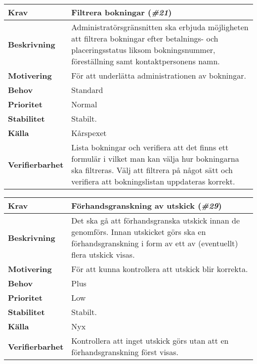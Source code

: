 \documentclass[a4paper, twoside, 11pt, titlepage]{article}
\begin{document}
		\begin{tabular} { p{2.6cm} p{12.5cm} }
			\hline
			\sffamily\textbf{Krav} & Filtrera bokningar (\emph{\#21})  \\
			\hline
			\sffamily\textbf{Beskrivning} & Administratörsgränsnitten ska erbjuda möjligheten att filtrera bokningar efter betalnings- och placeringsstatus liksom bokningsnummer, föreställning samt kontaktpersonens namn.  \\
			\hline
			\sffamily\textbf{Motivering} & För att underlätta administrationen av bokningar.  \\
			\hline
			\sffamily\textbf{Behov} & Standard  \\
			\hline
			\sffamily\textbf{Prioritet} & Normal  \\
			\hline
			\sffamily\textbf{Stabilitet} & Stabilt.  \\
			\hline
			\sffamily\textbf{Källa} & Kårspexet  \\
			\hline
			\sffamily\textbf{Verifierbarhet} & Lista bokningar och verifiera att det finns ett formulär i vilket man kan välja hur bokningarna ska filtreras. Välj att filtrera på något sätt och verifiera att bokningslistan uppdateras korrekt.  \\
			\hline
		\end{tabular}
		\vspace{6mm}

		\begin{tabular} { p{2.6cm} p{12.5cm} }
			\hline
			\sffamily\textbf{Krav} & Förhandsgranskning av utskick (\emph{\#29})  \\
			\hline
			\sffamily\textbf{Beskrivning} & Det ska gå att förhandsgranska utskick innan de genomförs. Innan utskicket görs ska en förhandsgranskning i form av ett av (eventuellt) flera utskick visas.  \\
			\hline
			\sffamily\textbf{Motivering} & För att kunna kontrollera att utskick blir korrekta.  \\
			\hline
			\sffamily\textbf{Behov} & Plus  \\
			\hline
			\sffamily\textbf{Prioritet} & Low  \\
			\hline
			\sffamily\textbf{Stabilitet} & Stabilt.  \\
			\hline
			\sffamily\textbf{Källa} & Nyx  \\
			\hline
			\sffamily\textbf{Verifierbarhet} & Kontrollera att inget utskick görs utan att en förhandsgranskning först visas.  \\
			\hline
		\end{tabular}
		\vspace{6mm}
\end{document}

